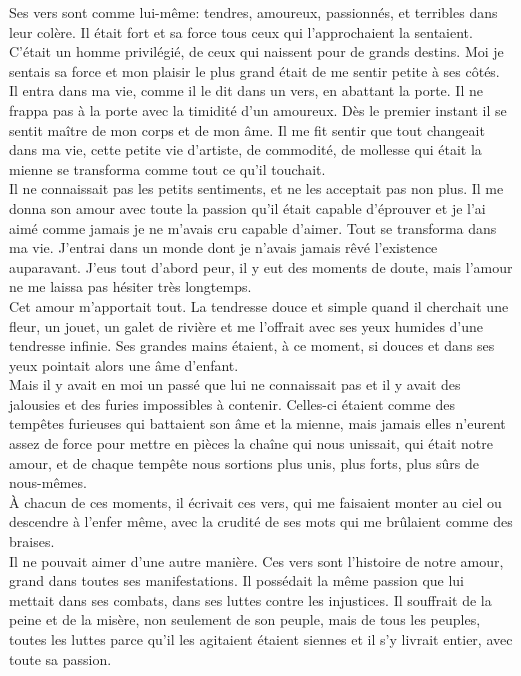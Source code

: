 \documentclass[11pt,a4paper]{book}
\begin{document}
{Ses vers sont comme lui-même: tendres, amoureux, passionnés, et
terribles dans leur colère. Il était fort et sa force tous ceux qui
l'approchaient la sentaient. C'était un homme privilégié, de ceux qui
naissent pour de grands destins. Moi je sentais sa force et mon
plaisir le plus grand était de me sentir petite à ses côtés. \\

Il entra dans ma vie, comme il le dit dans un vers, en abattant la
porte. Il ne frappa pas à la porte avec la timidité d'un amoureux. Dès
le premier instant il se sentit maître de mon corps et de mon âme. Il
me fit sentir que tout changeait dans ma vie, cette petite vie
d'artiste, de commodité, de mollesse qui était la mienne se transforma
comme tout ce qu'il touchait. \\

Il ne connaissait pas les petits sentiments, et ne les acceptait pas
non plus. Il me donna son amour avec toute la passion qu'il était
capable d'éprouver et je l'ai aimé comme jamais je ne m'avais cru
capable d'aimer. Tout se transforma dans ma vie. J'entrai dans un
monde dont je n'avais jamais rêvé l'existence auparavant. J'eus tout
d'abord peur, il y eut des moments de doute, mais l'amour ne me
laissa pas hésiter très longtemps. \\

Cet amour m'apportait tout. La tendresse douce et simple quand il
cherchait une fleur, un jouet, un galet de rivière et me l'offrait
avec ses yeux humides d'une tendresse infinie. Ses grandes mains
étaient, à ce moment, si douces et dans ses yeux pointait alors une
âme d'enfant. \\

Mais il y avait en moi un passé que lui ne connaissait pas et il y
avait des jalousies et des furies impossibles à contenir. Celles-ci
étaient comme des tempêtes furieuses qui battaient son âme et la
mienne, mais jamais elles n'eurent assez de force pour mettre en
pièces la chaîne qui nous unissait, qui était notre amour, et de
chaque tempête nous sortions plus unis, plus forts, plus sûrs de
nous-mêmes. \\

À chacun de ces moments, il écrivait ces vers, qui me faisaient
monter au ciel ou descendre à l'enfer même, avec la crudité de ses
mots qui me brûlaient comme des braises. \\

Il ne pouvait aimer d'une autre manière. Ces vers sont l'histoire de
notre amour, grand dans toutes ses manifestations. Il possédait la
même passion que lui mettait dans ses combats, dans ses luttes contre
les injustices. Il souffrait de la peine et de la misère, non
seulement de son peuple, mais de tous les peuples, toutes les luttes
parce qu'il les agitaient étaient siennes et il s'y livrait entier,
avec toute sa passion. \\

}
\end{document}
